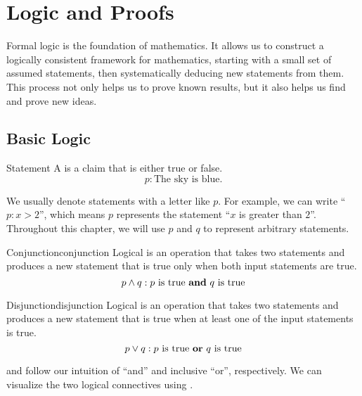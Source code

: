 \chapter{Logic and Proofs}

Formal logic is the foundation of mathematics. It allows us to construct a logically consistent framework for mathematics, starting with a small set of assumed statements, then systematically deducing new statements from them. This process not only helps us to prove known results, but it also helps us find and prove new ideas.

\section{Basic Logic}
\begin{dfnbox}{Statement}{}
    A  is a claim that is either true or false.
    \tcblower
    \[ p : \text{The sky is blue.} \]
\end{dfnbox}

We usually denote statements with a letter like $p$. For example, we can write ``$p: x > 2$'', which means $p$ represents the statement ``$x$ is greater than $2$''. Throughout this chapter, we will use $p$ and $q$ to represent arbitrary statements.

\begin{dfnbox}{Conjunction}{conjunction}
    Logical  is an operation that takes two statements and produces a new statement that is true only when both input statements are true.
    \tcblower
    \[ p \land q : p\ \text{is true \textbf{and}}\ q\ \text{is true} \]
\end{dfnbox}

\begin{dfnbox}{Disjunction}{disjunction}
    Logical  is an operation that takes two statements and produces a new statement that is true when at least one of the input statements is true.    \tcblower
    \[ p \lor q : p\ \text{is true \textbf{or}}\ q\ \text{is true} \]
\end{dfnbox}

 and  follow our intuition of ``and'' and inclusive ``or'', respectively. We can visualize the two logical connectives using .

